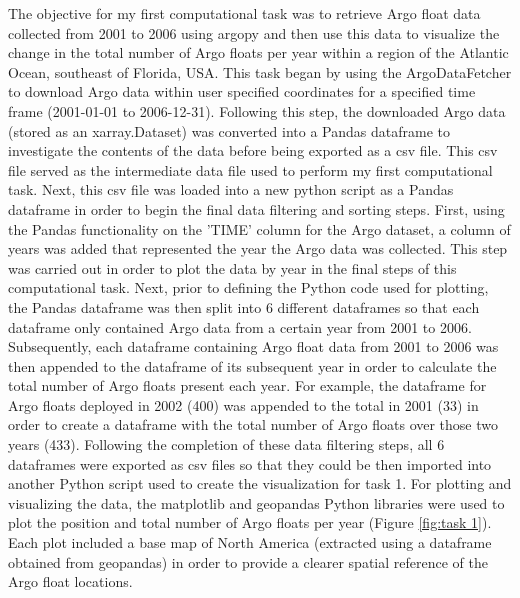 \documentclass{article}
\begin{document}
The objective for my first computational task was to retrieve Argo float data collected from 2001 to 2006 using argopy and then use this data to visualize the change in the total number of Argo floats per year within a region of the Atlantic Ocean, southeast of Florida, USA. This task began by using the ArgoDataFetcher to download Argo data within user specified coordinates for a specified time frame (2001-01-01 to 2006-12-31). Following this step, the downloaded Argo data (stored as an xarray.Dataset) was converted into a Pandas dataframe to investigate the contents of the data before being exported as a csv file. This csv file served as the intermediate data file used to perform my first computational task. Next, this csv file was loaded into a new python script as a Pandas dataframe in order to begin the final data filtering and sorting steps. First, using the Pandas functionality on the 'TIME' column for the Argo dataset, a column of years was added that represented the year the Argo data was collected. This step was carried out in order to plot the data by year in the final steps of this computational task. Next, prior to defining the Python code used for plotting, the Pandas dataframe was then split into 6 different dataframes so that each dataframe only contained Argo data from a certain year from 2001 to 2006. Subsequently, each dataframe containing Argo float data from 2001 to 2006 was then appended to the dataframe of its subsequent year in order to calculate the total number of Argo floats present each year. For example, the dataframe for Argo floats deployed in 2002 (400) was appended to the total in 2001 (33) in order to create a dataframe with the total number of Argo floats over those two years (433). Following the completion of these data filtering steps, all 6 dataframes were exported as csv files so that they could be then imported into another Python script used to create the visualization for task 1. For plotting and visualizing the data, the matplotlib and geopandas Python libraries were used to plot the position and total number of Argo floats per year (Figure \ref{fig:task 1}). Each plot included a base map of North America (extracted using a dataframe obtained from geopandas) in order to provide a clearer spatial reference of the Argo float locations.
\end{document}

